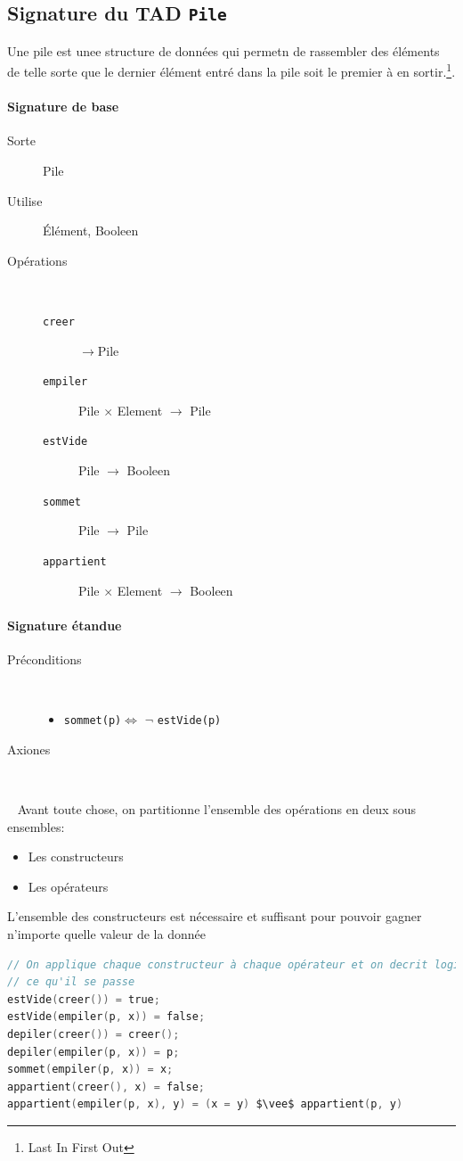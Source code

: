 \subsection{Signature du TAD \texttt{Pile}}
Une pile est unee structure de données qui permetn de rassembler des éléments de telle sorte que le dernier élément entré dans la pile soit le premier à
en sortir.\footnote{Last In First Out}.
\paragraph{Signature de base}
\begin{description}
	\item[Sorte] Pile
	\item[Utilise] Élément, Booleen 
	\item[Opérations]~ 
		\begin{description}
			\item[\texttt{creer}] $\rightarrow$Pile %
			\item[\texttt{empiler}] Pile $\times$ Element $\rightarrow$ Pile
			\item[\texttt{estVide}] Pile $\rightarrow$ Booleen  %
			\item[\texttt{sommet}] Pile $\rightarrow$ Pile
			\item[\texttt{appartient}] Pile $\times$ Element $\rightarrow$ Booleen 
		\end{description}
\end{description}

\paragraph{Signature étandue}
\begin{description}
	\item[Préconditions]~
		\begin{itemize}
			\item \texttt{sommet(p)}$\Leftrightarrow$ $\neg$ \texttt{estVide(p)}
		\end{itemize}
	\item[Axiones]~
\end{description}
~\newline
Avant toute chose, on partitionne l'ensemble des opérations en deux sous ensembles: 
\begin{itemize}
	\item Les constructeurs
	\item Les opérateurs
\end{itemize}
L'ensemble des constructeurs est nécessaire et suffisant pour pouvoir gagner n'importe quelle valeur de la donnée
\begin{lstlisting}[language=C, numbers=none,caption=Opérations du TAD Pile]
// On applique chaque constructeur à chaque opérateur et on decrit logiquement 
// ce qu'il se passe
estVide(creer()) = true;
estVide(empiler(p, x)) = false;
depiler(creer()) = creer();
depiler(empiler(p, x)) = p;
sommet(empiler(p, x)) = x;
appartient(creer(), x) = false;
appartient(empiler(p, x), y) = (x = y) $\vee$ appartient(p, y)
 \end{lstlisting}

